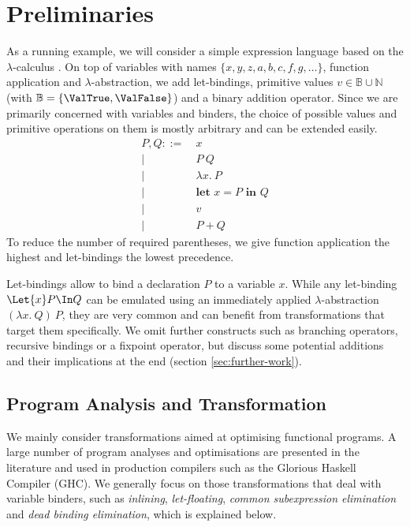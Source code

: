 \chapter{Preliminaries}
\label{ch:preliminaries}
    As a running example, we will consider a simple expression language
    based on the $\lambda$-calculus
    \cite{Barendregt1985LambdaCalculus}.
    On top of variables with names $\{ x, y, z, a, b, c, f, g, \ldots \}$, function application and $\lambda$-abstraction,
    we add let-bindings, primitive values $v \in \mathbb{B} \cup \mathbb{N}$ (with $\mathbb{B} = \{ \ValTrue , \ValFalse \}$) and a binary addition operator.
    Since we are primarily concerned with variables and binders,
    the choice of possible values and primitive operations on them is mostly arbitrary and can be extended easily.
    \begin{align*}
      P, Q ::=&\ x
      \\ \big|&\ P\ Q
      \\ \big|&\ \lambda x.\ P
      \\ \big|&\ \textbf{let } x = P \textbf{ in } Q
      \\ \big|&\ v
      \\ \big|&\ P + Q
    \end{align*}
    To reduce the number of required parentheses,
    we give function application the highest
    and let-bindings the lowest precedence.

    Let-bindings allow to bind a declaration $P$ to a variable $x$.
    While any let-binding $\Let{x} P \In Q$ can be emulated
    using an immediately applied $\lambda$-abstraction $(\lambda x.\ Q)\ P$,
    they are very common and can benefit
    from transformations that target them specifically.
    We omit further constructs such as branching operators,
    recursive bindings or a fixpoint operator,
    but discuss some potential additions and their implications
    at the end (section \ref{sec:further-work}).

\section{Program Analysis and Transformation}
\label{sec:program-transformations}
    We mainly consider transformations aimed at optimising functional programs.
    A large number of program analyses and optimisations are presented in the literature
    \cite{Nielson1999PrinciplesProgramAnalysis,Santos1995CompilationByTransformation}
    and used in production compilers such as the Glorious Haskell Compiler (GHC).
    We generally focus on those transformations that deal with variable binders,
    such as
    \emph{inlining},
    \emph{let-floating},
    \emph{common subexpression elimination} and
    \emph{dead binding elimination},
    which is explained below.

